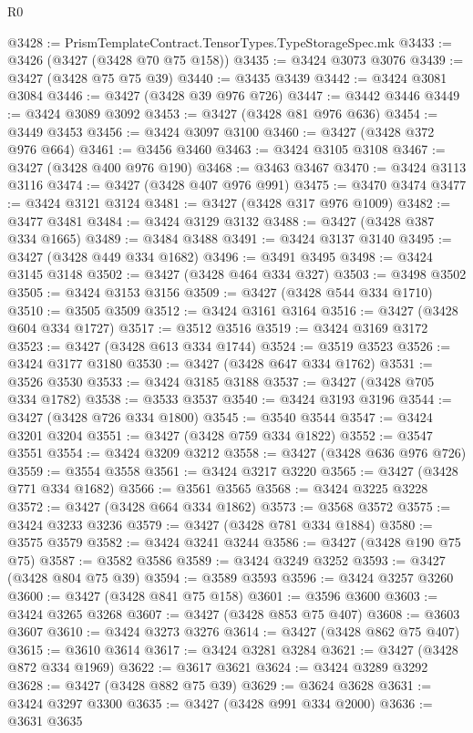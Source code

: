 \begin{lexlean}{R0}
\begin{coremodule}
@3428 := PrismTemplateContract.TensorTypes.TypeStorageSpec.mk
@3433 := @3426 (@3427 (@3428 @70 @75 @158))
@3435 := @3424 @3073 @3076
@3439 := @3427 (@3428 @75 @75 @39)
@3440 := @3435 @3439
@3442 := @3424 @3081 @3084
@3446 := @3427 (@3428 @39 @976 @726)
@3447 := @3442 @3446
@3449 := @3424 @3089 @3092
@3453 := @3427 (@3428 @81 @976 @636)
@3454 := @3449 @3453
@3456 := @3424 @3097 @3100
@3460 := @3427 (@3428 @372 @976 @664)
@3461 := @3456 @3460
@3463 := @3424 @3105 @3108
@3467 := @3427 (@3428 @400 @976 @190)
@3468 := @3463 @3467
@3470 := @3424 @3113 @3116
@3474 := @3427 (@3428 @407 @976 @991)
@3475 := @3470 @3474
@3477 := @3424 @3121 @3124
@3481 := @3427 (@3428 @317 @976 @1009)
@3482 := @3477 @3481
@3484 := @3424 @3129 @3132
@3488 := @3427 (@3428 @387 @334 @1665)
@3489 := @3484 @3488
@3491 := @3424 @3137 @3140
@3495 := @3427 (@3428 @449 @334 @1682)
@3496 := @3491 @3495
@3498 := @3424 @3145 @3148
@3502 := @3427 (@3428 @464 @334 @327)
@3503 := @3498 @3502
@3505 := @3424 @3153 @3156
@3509 := @3427 (@3428 @544 @334 @1710)
@3510 := @3505 @3509
@3512 := @3424 @3161 @3164
@3516 := @3427 (@3428 @604 @334 @1727)
@3517 := @3512 @3516
@3519 := @3424 @3169 @3172
@3523 := @3427 (@3428 @613 @334 @1744)
@3524 := @3519 @3523
@3526 := @3424 @3177 @3180
@3530 := @3427 (@3428 @647 @334 @1762)
@3531 := @3526 @3530
@3533 := @3424 @3185 @3188
@3537 := @3427 (@3428 @705 @334 @1782)
@3538 := @3533 @3537
@3540 := @3424 @3193 @3196
@3544 := @3427 (@3428 @726 @334 @1800)
@3545 := @3540 @3544
@3547 := @3424 @3201 @3204
@3551 := @3427 (@3428 @759 @334 @1822)
@3552 := @3547 @3551
@3554 := @3424 @3209 @3212
@3558 := @3427 (@3428 @636 @976 @726)
@3559 := @3554 @3558
@3561 := @3424 @3217 @3220
@3565 := @3427 (@3428 @771 @334 @1682)
@3566 := @3561 @3565
@3568 := @3424 @3225 @3228
@3572 := @3427 (@3428 @664 @334 @1862)
@3573 := @3568 @3572
@3575 := @3424 @3233 @3236
@3579 := @3427 (@3428 @781 @334 @1884)
@3580 := @3575 @3579
@3582 := @3424 @3241 @3244
@3586 := @3427 (@3428 @190 @75 @75)
@3587 := @3582 @3586
@3589 := @3424 @3249 @3252
@3593 := @3427 (@3428 @804 @75 @39)
@3594 := @3589 @3593
@3596 := @3424 @3257 @3260
@3600 := @3427 (@3428 @841 @75 @158)
@3601 := @3596 @3600
@3603 := @3424 @3265 @3268
@3607 := @3427 (@3428 @853 @75 @407)
@3608 := @3603 @3607
@3610 := @3424 @3273 @3276
@3614 := @3427 (@3428 @862 @75 @407)
@3615 := @3610 @3614
@3617 := @3424 @3281 @3284
@3621 := @3427 (@3428 @872 @334 @1969)
@3622 := @3617 @3621
@3624 := @3424 @3289 @3292
@3628 := @3427 (@3428 @882 @75 @39)
@3629 := @3624 @3628
@3631 := @3424 @3297 @3300
@3635 := @3427 (@3428 @991 @334 @2000)
@3636 := @3631 @3635

\end{coremodule}
\end{lexlean}
